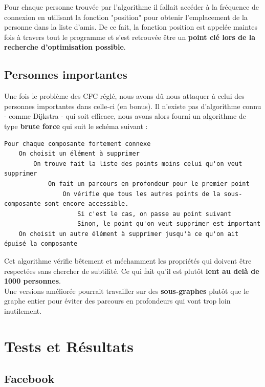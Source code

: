 \documentclass[a4paper, titlepage, oneside]{book}
\begin{document}
Pour chaque personne trouvée par l'algorithme il fallait accéder à la fréquence de connexion en utilisant la fonction "position" pour obtenir l'emplacement de la personne dans la liste d'amis. De ce fait, la fonction position est appelée maintes fois à travers tout le programme et s'est retrouvée être un \textbf{point clé lors de la recherche d'optimisation possible}.\\

\section{Personnes importantes}

Une fois le problème des CFC réglé, nous avons dû nous attaquer à celui des personnes importantes dans celle-ci (en bonus). Il n'existe pas d'algorithme connu - comme Dijkstra - qui soit efficace, nous avons alors fourni un algorithme de type \textbf{brute force} qui suit le schéma suivant :\\

\newpage

\begin{verbatim}
Pour chaque composante fortement connexe
	On choisit un élément à supprimer
		On trouve fait la liste des points moins celui qu'on veut supprimer
			On fait un parcours en profondeur pour le premier point
				On vérifie que tous les autres points de la sous-composante sont encore accessible.
					Si c'est le cas, on passe au point suivant
					Sinon, le point qu'on veut supprimer est important
	On choisit un autre élément à supprimer jusqu'à ce qu'on ait épuisé la composante
\end{verbatim}

Cet algorithme vérifie bêtement et méchamment les propriétés qui doivent être respectées sans chercher de subtilité. Ce qui fait qu'il est plutôt \textbf{lent au delà de 1000 personnes}.\\
Une versions améliorée pourrait travailler sur des \textbf{sous-graphes} plutôt que le graphe entier pour éviter des parcours en profondeurs qui vont trop loin inutilement.\\

\chapter{Tests et Résultats}

\section{Facebook}
\end{document}

